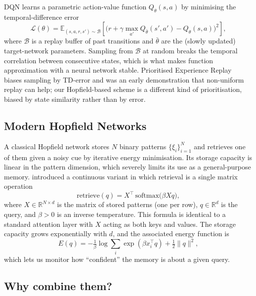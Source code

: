 \documentclass[a4paper,11pt]{article}
\begin{document}
DQN learns a parametric action-value function $Q_\theta(s,a)$ by minimising
the temporal-difference error
\begin{equation}
    \mathcal{L}(\theta) =
    \mathbb{E}_{(s,a,r,s') \sim \mathcal{B}}
    \left[
        \bigl(r + \gamma \max_{a'} Q_{\bar\theta}(s',a') - Q_\theta(s,a)\bigr)^2
    \right],
\end{equation}
where $\mathcal{B}$ is a replay buffer of past transitions and
$\bar\theta$ are the (slowly updated) target-network parameters. Sampling
from $\mathcal{B}$ at random breaks the temporal correlation between
consecutive states, which is what makes function approximation with a
neural network stable. Prioritised Experience
Replay~\citep{schaul2016prioritized} biases sampling by TD-error and was
an early demonstration that non-uniform replay can help; our
Hopfield-based scheme is a different kind of prioritisation, biased by
state similarity rather than by error.

\subsection{Modern Hopfield Networks}

A classical Hopfield network stores $N$ binary patterns
$\{\xi_i\}_{i=1}^{N}$ and retrieves one of them given a noisy cue by
iterative energy minimisation. Its storage capacity is linear in the
pattern dimension, which severely limits its use as a general-purpose
memory. \citet{ramsauer2020hopfield} introduced a continuous variant in
which retrieval is a single matrix operation
\begin{equation}
    \mathrm{retrieve}(q) = X^\top \,\mathrm{softmax}\bigl(\beta X q\bigr),
    \label{eq:hopfield}
\end{equation}
where $X \in \mathbb{R}^{N \times d}$ is the matrix of stored patterns
(one per row), $q \in \mathbb{R}^d$ is the query, and $\beta > 0$ is an
inverse temperature. This formula is identical to a standard attention
layer with $X$ acting as both keys and values. The storage capacity grows
exponentially with $d$, and the associated energy function is
\begin{equation}
    E(q) = -\tfrac{1}{\beta}\log \textstyle\sum_i \exp(\beta x_i^\top q)
        + \tfrac{1}{2}\|q\|^2,
\end{equation}
which lets us monitor how ``confident'' the memory is about a given query.

\subsection{Why combine them?}
\end{document}
